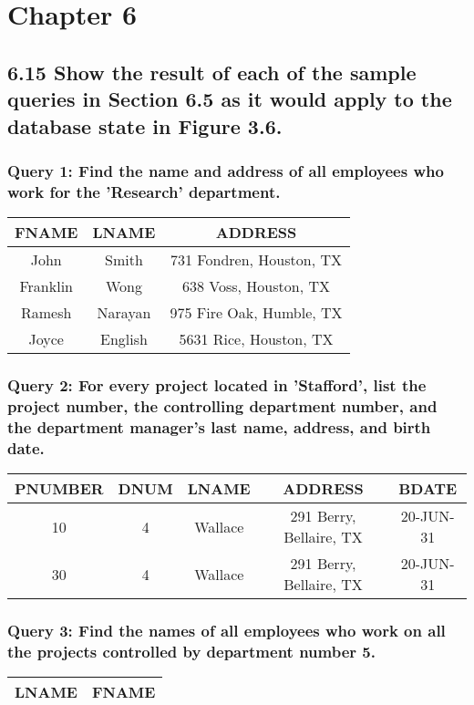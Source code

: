 \section*{Chapter 6}

\subsection*{6.15 Show the result of each of the sample queries in Section 6.5 as it would apply to the database state in Figure 3.6.} 
\subsubsection*{Query 1: Find the name and address of all employees who work for the 'Research' department.}
\begin{center}
\begin{tabular}{ c | c | c }
  FNAME & LNAME & ADDRESS \\ \hline
  John & Smith & 731 Fondren, Houston, TX \\
  Franklin & Wong & 638 Voss, Houston, TX \\
  Ramesh &  Narayan & 975 Fire Oak, Humble, TX \\
  Joyce & English & 5631 Rice, Houston, TX \\
\end{tabular}
\end{center}

\subsubsection*{Query 2: For every project located in 'Stafford', list the project number, the controlling department number, and the department manager's last name, address, and birth date.}
\begin{center} 
\begin{tabular}{ c | c | c | c | c}
  PNUMBER & DNUM & LNAME & ADDRESS & BDATE \\ \hline
  10 & 4 & Wallace & 291 Berry, Bellaire, TX &20-JUN-31 \\
  30 & 4 & Wallace & 291 Berry, Bellaire, TX & 20-JUN-31 \\ 
\end{tabular}
\end{center}

\subsubsection*{Query 3: Find the names of all employees who work on all the projects controlled by department number 5.}
\begin{center}
\begin{tabular}{ c | c }
  LNAME & FNAME \\ \hline
\end{tabular}
\end{center}

